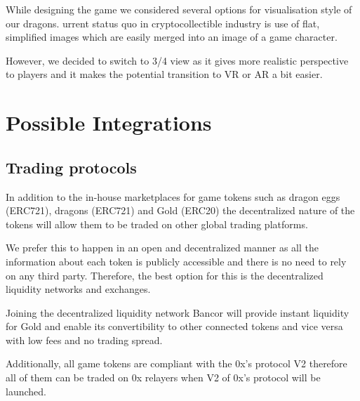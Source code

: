 \documentclass[12pt]{article}
\begin{document}
While designing the game we considered several options for visualisation style of our dragons. urrent status quo in cryptocollectible industry is  use of flat, simplified images which are easily merged into an image of a game character.\par

However, we decided to switch to 3/4 view as it gives more realistic perspective to players and it makes the potential transition to VR or AR a bit easier.


\newpage
\par

\section{Possible Integrations}
 \label{Possible Integrations}  \par


\vspace{\baselineskip}
\subsection{Trading protocols}\label{Trading protocols}\par

In addition to the in-house marketplaces for game tokens such as dragon eggs (ERC721), dragons (ERC721) and Gold (ERC20) the decentralized nature of the tokens will allow them to be traded on other global trading platforms.\par

We prefer this to happen in an open and decentralized manner as all the information about each token is publicly accessible and there is no need to rely on any third party. Therefore, the best option for this is the decentralized liquidity networks and exchanges.\par

Joining the decentralized liquidity network Bancor will provide instant liquidity for Gold and enable its convertibility to other connected tokens and vice versa with low fees and no trading spread.\par

Additionally, all game tokens are compliant with the 0x’s protocol V2 therefore all of them can be traded on 0x relayers when V2 of 0x’s protocol will be launched.\par
\end{document}
